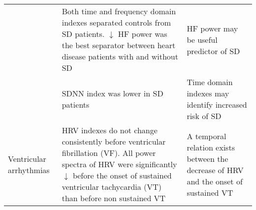 \begin{center}
\begin{longtable}{|p{4cm}|p{4cm}|p{4cm}|}
	&Both time and frequency domain indexes separated controls from SD patients. $\downarrow$ HF power was the best separator between heart disease patients
	with and without SD& HF power may be useful predictor of SD\\\cline{2-3}
	&SDNN index was lower in SD patients&Time domain indexes may identify increased risk of SD\\ \hline
Ventricular arrhythmias&HRV indexes do not change consistently before ventricular fibrillation (VF). All power spectra of HRV were significantly $\downarrow$ before the onset of sustained ventricular tachycardia (VT) than before non sustained VT & A temporal relation exists between the decrease of HRV and the onset of sustained VT \\ \hline
\end{longtable}
\end{center}

